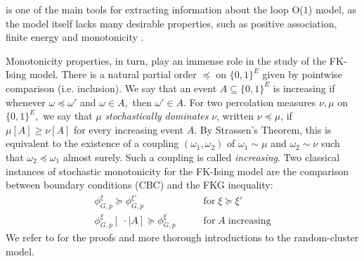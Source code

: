 \documentclass[article,11pt,reqno]{amsart}
\begin{document}
 is one of the main tools for extracting information about the loop O($1$) model, as the model itself lacks many desirable properties, such as positive association, finite energy and monotonicity \cite{klausen2021monotonicity}.

Monotonicity properties, in turn, play an immense role in the study of the FK-Ising model.
There is a natural partial order $\preceq$ on $\{0,1\}^E$ given by pointwise comparison (i.e. inclusion). We say that an event $A\subseteq \{0,1\}^E$ is increasing if whenever $\omega\preceq \omega'$ and $\omega\in A,$ then $\omega'\in A$. For two percolation measures $\nu,\mu$ on $\{0,1\}^E,$ we say that $\mu$ \emph{stochastically dominates} $\nu$, written $\nu\preceq \mu$, if $\mu[A]\geq \nu[A]$ for every increasing event $A$. By Strassen's Theorem, this is equivalent to the existence of a coupling $(\omega_1,\omega_2)$ of $\omega_1\sim \mu$ and $\omega_2\sim \nu$ such that $\omega_2\preceq \omega_1$ almost surely. Such a coupling is called \emph{increasing}. Two classical instances of stochastic monotonicity for the FK-Ising model are the comparison between boundary conditions (CBC) and the FKG inequality:
\begin{align*}
\phi^{\xi}_{G,p}\succeq \phi^{\xi'}_{G,p} &\qquad \mathrm{for} \; \xi\succeq \xi'\label{eq_CBC} \tag{CBC}\\
\phi^{\xi}_{G,p}[\;\cdot\mid A]\succeq \phi^{\xi}_{G,p} &\qquad \mathrm{for}\; A\; \mathrm{increasing} \label{FKG} \tag{FKG}
\end{align*}
We refer to \cite{DC17,Gri06} for the proofs and more thorough introductions to the random-cluster model. 
\end{document}
